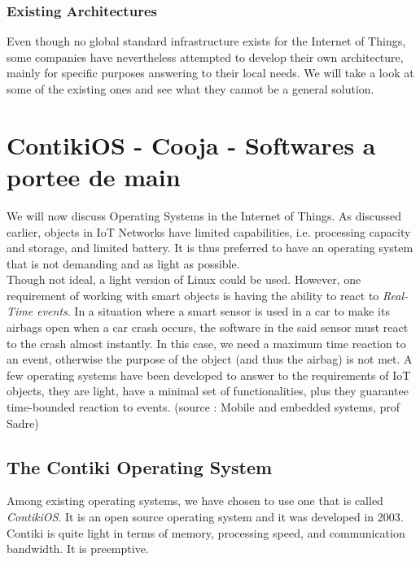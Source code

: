 \subsection{Existing Architectures}

Even though no global standard infrastructure exists for the Internet of Things, some companies have nevertheless attempted to develop their own architecture, mainly for specific purposes answering to their local needs. We will take a look at some of the existing ones and see what they cannot be a general solution.\\


\chapter{ContikiOS - Cooja - Softwares a portee de main}

We will now discuss Operating Systems in the Internet of Things. As discussed earlier, objects in IoT Networks have limited capabilities, i.e. processing capacity and storage, and limited battery. It is thus preferred to have an operating system that is not demanding and as light as possible. \\

Though not ideal, a light version of Linux could be used. However, one requirement of working with smart objects is having the ability to react to \textit{Real-Time events}. In a situation where a smart sensor is used in a car to make its airbags open when a car crash occurs, the software in the said sensor must react to the crash almost instantly. In this case, we need a maximum time reaction to an event, otherwise the purpose of the object (and thus the airbag) is not met. A few operating systems have been developed to answer to the requirements of IoT objects, they are light, have a minimal set of functionalities, plus they guarantee time-bounded reaction to events. (source : Mobile and embedded systems, prof Sadre)\\

\section{The Contiki Operating System}

Among existing operating systems, we have chosen to use one that is called \textit{ContikiOS}. It is an open source operating system and it was developed in 2003. Contiki is quite light in terms of memory, processing speed, and communication bandwidth. It is preemptive.\\

